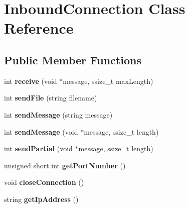 \hypertarget{class_inbound_connection}{}\section{Inbound\+Connection Class Reference}
\label{class_inbound_connection}
\subsection*{Public Member Functions}
\begin{DoxyCompactItemize}
\item 
\hypertarget{class_inbound_connection_a10aeeaf1acc0c3d625f138dcd711df65}{}int {\bfseries receive} (void $\ast$message, ssize\+\_\+t max\+Length)\label{class_inbound_connection_a10aeeaf1acc0c3d625f138dcd711df65}

\item 
\hypertarget{class_inbound_connection_a512980076852e1f4b4c25692d28dd0ff}{}int {\bfseries send\+File} (string filename)\label{class_inbound_connection_a512980076852e1f4b4c25692d28dd0ff}

\item 
\hypertarget{class_inbound_connection_a21a565cca0be0c1211b9f8051939bbcf}{}int {\bfseries send\+Message} (string message)\label{class_inbound_connection_a21a565cca0be0c1211b9f8051939bbcf}

\item 
\hypertarget{class_inbound_connection_af0cb51f56ec9b2c2dca6f48046d3fbe5}{}int {\bfseries send\+Message} (void $\ast$message, ssize\+\_\+t length)\label{class_inbound_connection_af0cb51f56ec9b2c2dca6f48046d3fbe5}

\item 
\hypertarget{class_inbound_connection_abc8d618382d23f9ff95d517293bdf2b2}{}int {\bfseries send\+Partial} (void $\ast$message, ssize\+\_\+t length)\label{class_inbound_connection_abc8d618382d23f9ff95d517293bdf2b2}

\item 
\hypertarget{class_inbound_connection_ab398c087e0f08671ae89ed30881830c0}{}unsigned short int {\bfseries get\+Port\+Number} ()\label{class_inbound_connection_ab398c087e0f08671ae89ed30881830c0}

\item 
\hypertarget{class_inbound_connection_a9f1c5e702fd0623d918dfae47a57b14c}{}void {\bfseries close\+Connection} ()\label{class_inbound_connection_a9f1c5e702fd0623d918dfae47a57b14c}

\item 
\hypertarget{class_inbound_connection_a3af5584f2a7f6161cfe17c3029c002cb}{}string {\bfseries get\+Ip\+Address} ()\label{class_inbound_connection_a3af5584f2a7f6161cfe17c3029c002cb}

\end{DoxyCompactItemize}
